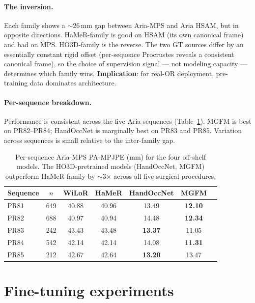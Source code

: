 \documentclass{article}
\begin{document}
\paragraph{The inversion.}
Each family shows a $\sim$26\,mm gap between Aria-MPS and Aria HSAM, but in opposite directions. HaMeR-family is good on HSAM (its own canonical frame) and bad on MPS. HO3D-family is the reverse. The two GT sources differ by an essentially constant rigid offset (per-sequence Procrustes reveals a consistent canonical frame), so the choice of supervision signal — not modeling capacity — determines which family wins. \textbf{Implication}: for real-OR deployment, pre-training data dominates architecture.

\paragraph{Per-sequence breakdown.}
Performance is consistent across the five Aria sequences (Table~\ref{tab:per_seq}). MGFM is best on PR82–PR84; HandOccNet is marginally best on PR83 and PR85. Variation across sequences is small relative to the inter-family gap.

\begin{table}[h]
\centering
\small
\caption{Per-sequence Aria-MPS PA-MPJPE (mm) for the four off-shelf models. The HO3D-pretrained models (HandOccNet, MGFM) outperform HaMeR-family by $\sim$3$\times$ across all five surgical procedures.}
\label{tab:per_seq}
\begin{tabular}{lcccccc}
\toprule
\textbf{Sequence} & $n$ & \textbf{WiLoR} & \textbf{HaMeR} & \textbf{HandOccNet} & \textbf{MGFM} \\
\midrule
PR81 & 649 & 40.88 & 40.96 & 13.49 & \textbf{12.10} \\
PR82 & 688 & 40.97 & 40.94 & 14.48 & \textbf{12.34} \\
PR83 & 242 & 43.43 & 43.48 & \textbf{13.37} & 11.05 \\
PR84 & 542 & 42.14 & 42.14 & 14.08 & \textbf{11.31} \\
PR85 & 212 & 42.67 & 42.64 & \textbf{13.20} & 13.47 \\
\bottomrule
\end{tabular}
\end{table}

\section{Fine-tuning experiments}
\label{sec:ft}
\end{document}
